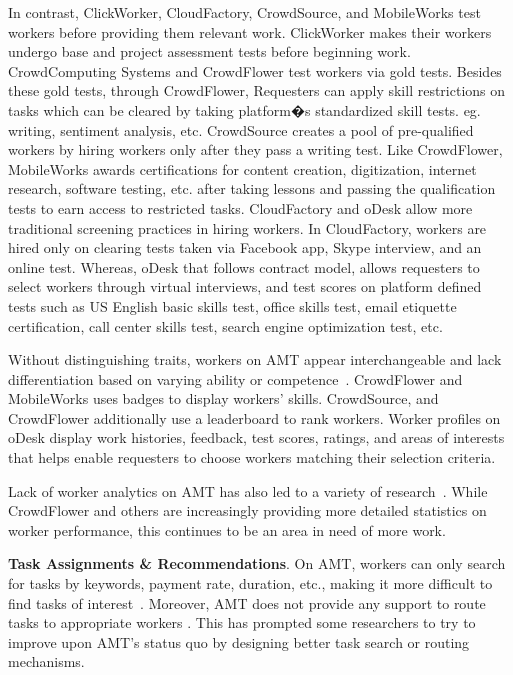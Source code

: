 \documentclass{sigchi}
\begin{document}
In contrast, ClickWorker, CloudFactory, CrowdSource, and MobileWorks test workers before providing them relevant work. ClickWorker makes their workers undergo base and project assessment tests before beginning work. CrowdComputing Systems and CrowdFlower test workers via gold tests. Besides these gold tests, through CrowdFlower, Requesters can apply skill restrictions on tasks which can be cleared by taking platform�s standardized skill tests. eg. writing, sentiment analysis, etc. CrowdSource creates a pool of pre-qualified workers by hiring workers only after they pass a writing test. Like CrowdFlower, MobileWorks awards certifications for content creation, digitization, internet research, software testing, etc. after taking lessons and passing the qualification tests to earn access to restricted tasks.
CloudFactory and oDesk allow more traditional screening practices in hiring workers. In CloudFactory, workers are hired only on clearing tests taken via Facebook app, Skype interview, and an online test. Whereas, oDesk that follows contract model, allows requesters to select workers through virtual interviews, and test scores on platform defined tests such as US English basic skills test, office skills test, email etiquette certification, call center skills test, search engine optimization test, etc. 



Without distinguishing traits, workers on AMT appear interchangeable and lack differentiation based on varying ability or competence~\cite{Ipeirotis-lemons}. 
CrowdFlower and MobileWorks uses badges to display workers' skills. CrowdSource, and CrowdFlower additionally use a leaderboard to rank workers. Worker profiles on oDesk display work histories, feedback, test scores, ratings, and areas of interests that helps enable requesters to choose workers matching their selection criteria.

Lack of worker analytics on AMT has also led to a variety of research~\cite{heymann2011turkalytics,Rzeszotarski11}. While CrowdFlower and others are increasingly providing more detailed statistics on worker performance, this continues to be an area in need of more work. 


{\bf Task Assignments \& Recommendations}. On AMT, workers can only search for tasks by keywords, payment rate, duration, etc., making it more difficult to find tasks of interest~\cite{chilton2010task,law2011effects,panos2010pleatoamazon}. Moreover, AMT does not provide any support to route tasks to appropriate workers \cite{Ho2012}. This has prompted some researchers to try to improve upon AMT's status quo by designing better task search or routing mechanisms. 
\end{document}
